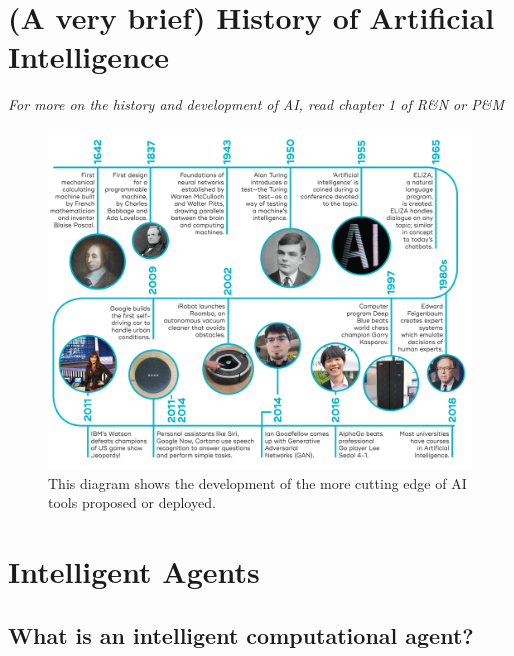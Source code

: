 \documentclass[12pt]{article}
\begin{document}
\newpage
\section*{(A very brief) History of Artificial Intelligence}

\emph{For more on the history and development of AI, read chapter 1 of R\&N or P\&M}

\begin{figure}[h!]
        \centering
        \includegraphics{ai-timeline.jpg}
        \caption{This diagram shows the development of the more cutting edge of AI tools proposed or deployed.}
        \label{fig:my_label}
\end{figure}

\newpage
\section*{Intelligent Agents}

\subsection*{What is an intelligent computational agent?}
\end{document}
